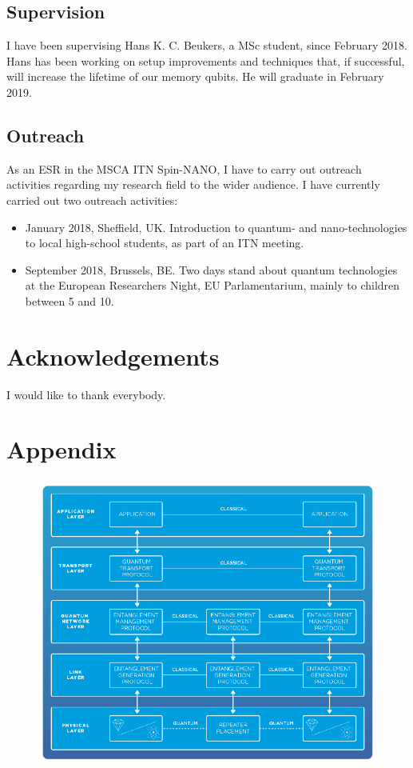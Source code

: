 \documentclass[a4paper, twoside]{article}
\begin{document}
\subsection{Supervision}
I have been supervising Hans K. C. Beukers, a MSc student, since February 2018. Hans has been working on setup improvements and techniques that, if successful, will increase the lifetime of our memory qubits. He will graduate in February 2019.

\subsection{Outreach}
As an \ac{ESR} in the \ac{MSCA} \ac{ITN} Spin-NANO, I have to carry out outreach activities regarding my research field to the wider audience. I have currently carried out two outreach activities:
\begin{itemize}
	\item January 2018, Sheffield, UK. Introduction to quantum- and nano-technologies to local high-school students, as part of an \ac{ITN} meeting. 
	\item September 2018, Brussels, BE. Two days stand about quantum technologies at the European Researchers Night, EU Parlamentarium, mainly to children between 5 and 10. 
\end{itemize}

\section*{Acknowledgements}
I would like to thank everybody.

\section*{Appendix}
\renewcommand{\thefigure}{A\arabic{figure}}
\setcounter{figure}{0}

\begin{figure}[h!]
	\includegraphics[width=\textwidth]{images/network_stack.png}
	\caption{}
	\label{fig:network_stack}
\end{figure}

\newpage
\printbibliography[heading=bibintoc]
\end{document}
